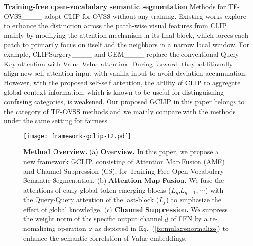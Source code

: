 \noindent \textbf{Training-free open-vocabulary semantic segmentation}
Methods for TF-OVSS____ adopt CLIP for OVSS without any training.
Existing works explore to enhance the distinction across the patch-wise visual features from CLIP mainly by modifying the attention mechanism in its final block, which forces each patch to primarily focus on itself and the neighbors in a narrow local window.
For example, CLIPSurgery____ and GEM____ replace the conventional Query-Key attention with Value-Value attention. During forward, 
they additionally align new self-attention input with vanilla input to avoid deviation accumulation.
However, with the proposed self-self attention, the ability of CLIP to aggregate global context information, which is known to be useful for distinguishing confusing categories, is weakened.
Our proposed GCLIP in this paper belongs to the category of TF-OVSS methods and we mainly compare with the methods under the same setting for fairness.


\begin{figure*}
  \centering
\texttt{[image: framework-gclip-12.pdf]}
  \caption{\textbf{Method Overview.} 
  (a) \textbf{Overview.} In this paper, we propose a new framework GCLIP, consisting of Attention Map Fusion (AMF) and Channel Suppression (CS), for Training-Free Open-Vocabulary Semantic Segmentation. 
  (b) \textbf{Attention Map Fusion.} We fuse the attentions of early global-token emerging blocks ($L_g$,$L_{g+1}$, $\cdots$) with the Query-Query attention of the last-block ($L_{f}$) to emphasize the effect of global knowledge.
  (c) \textbf{Channel Suppression.} We suppress the weight norm of the specific output channel $\hat{d}$ of FFN by a re-nomalizing operation $\varphi$ as depicted in Eq.~(\ref{formula:renormalize}) to enhance the semantic correlation of Value embeddings.}
\label{method_fig}
\end{figure*}